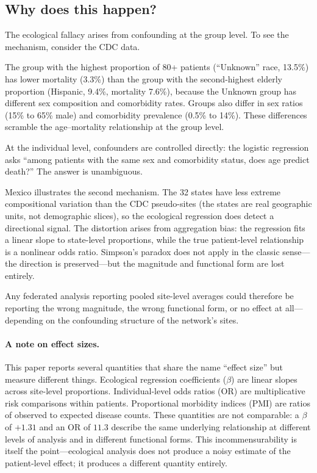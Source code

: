 \documentclass{article}
\begin{document}
\subsection{Why does this happen?}

The ecological fallacy arises from confounding at the group level.  To see
the mechanism, consider the CDC data.

The group with the highest proportion of 80+ patients (``Unknown'' race,
13.5\%) has lower mortality (3.3\%) than the group with the second-highest
elderly proportion (Hispanic, 9.4\%, mortality 7.6\%), because the Unknown
group has different sex composition and comorbidity rates.  Groups also
differ in sex ratios (15\% to 65\% male) and comorbidity prevalence (0.5\%
to 14\%).  These differences scramble the age--mortality relationship at the
group level.

At the individual level, confounders are controlled directly: the logistic
regression asks ``among patients with the same sex and comorbidity status,
does age predict death?''  The answer is unambiguous.

Mexico illustrates the second mechanism.  The 32 states have less extreme
compositional variation than the CDC pseudo-sites (the states are real
geographic units, not demographic slices), so the ecological regression does
detect a directional signal.  The distortion arises from aggregation bias:
the regression fits a linear slope to state-level proportions, while the
true patient-level relationship is a nonlinear odds ratio.  Simpson's
paradox does not apply in the classic sense---the direction is preserved---but
the magnitude and functional form are lost entirely.

Any federated analysis reporting pooled site-level averages could therefore
be reporting the wrong magnitude, the wrong functional form, or no effect
at all---depending on the confounding structure of the network's sites.

\paragraph{A note on effect sizes.}
This paper reports several quantities that share the name ``effect size''
but measure different things.  Ecological regression coefficients ($\beta$)
are linear slopes across site-level proportions.  Individual-level odds
ratios (OR) are multiplicative risk comparisons within patients.
Proportional morbidity indices (PMI) are ratios of observed to expected
disease counts.  These quantities are not comparable: a $\beta$ of $+1.31$
and an OR of $11.3$ describe the same underlying relationship at different
levels of analysis and in different functional forms.  This
incommensurability is itself the point---ecological analysis does not
produce a noisy estimate of the patient-level effect; it produces a
different quantity entirely.
\end{document}
